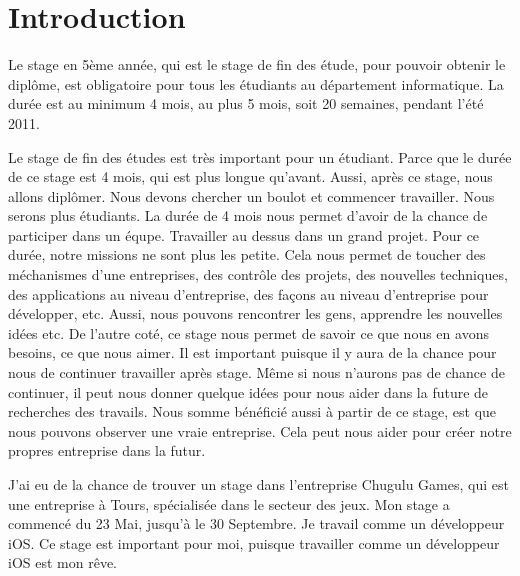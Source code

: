 \chapter{Introduction} %

Le stage en 5ème année, qui est le stage de fin des étude, pour pouvoir obtenir le diplôme, est obligatoire pour tous les étudiants au département informatique. La durée est au minimum 4 mois, au plus 5 mois, soit 20 semaines, pendant l’été 2011. 

Le stage de fin des études est très important pour un étudiant. Parce que le durée de ce stage est 4 mois, qui est plus longue qu'avant. Aussi, après ce stage, nous allons diplômer. Nous devons chercher un boulot et commencer travailler. Nous serons plus étudiants. La durée de 4 mois nous permet d'avoir de la chance de participer dans un équpe. Travailler au dessus dans un grand projet. Pour ce durée, notre missions ne sont plus les petite. Cela nous permet de toucher des méchanismes d'une entreprises, des contrôle des projets, des nouvelles techniques, des applications au niveau d'entreprise, des façons au niveau d'entreprise pour développer, etc. Aussi, nous pouvons rencontrer les gens, apprendre les nouvelles idées etc. De l'autre coté, ce stage nous permet de savoir ce que nous en avons besoins, ce que nous aimer. Il est important puisque il y aura de la chance pour nous de continuer travailler après stage. Même si nous n'aurons pas de chance de continuer, il peut nous donner quelque idées pour nous aider dans la future de recherches des travails. Nous somme bénéficié aussi à partir de ce stage, est que nous pouvons observer une vraie entreprise. Cela peut nous aider pour créer notre propres entreprise dans la futur.

J’ai eu de la chance de trouver un stage dans l’entreprise Chugulu Games, qui est une entreprise à Tours, spécialisée dans le secteur des jeux. Mon stage a commencé du 23 Mai, jusqu'à le 30 Septembre. Je travail comme un développeur iOS. Ce stage est important pour moi, puisque travailler comme un développeur iOS est mon rêve. 

